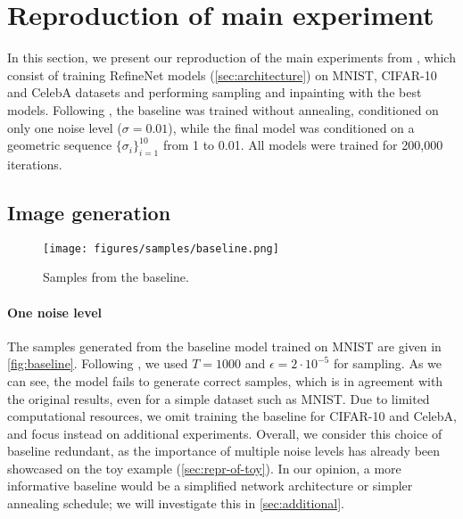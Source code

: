 
\section{Reproduction of main experiment}
\label{sec:main-exp}

In this section, we present our reproduction of the main experiments from \citep{ncsn-paper}, which consist of training RefineNet models (\autoref{sec:architecture}) on MNIST, CIFAR-10 and CelebA datasets and performing sampling and inpainting with the best models. Following \cite{ncsn-paper}, the baseline was trained without annealing, conditioned on only one noise level ($\sigma=0.01$), while the final model was conditioned on a geometric sequence $\{\sigma_i\}_{i = 1}^{10}$ from 1 to 0.01. All models were trained for 200,000 iterations. 

\subsection{Image generation}

\begin{figure}[h!]
    \centering
    \texttt{[image: figures/samples/baseline.png]}
    \caption{Samples from the baseline.}
    \label{fig:baseline}
\end{figure}
\paragraph{One noise level}
The samples generated from the baseline model trained on MNIST are given in \autoref{fig:baseline}. Following \cite{ncsn-paper}, we used $T=1000$ and $\epsilon=2 \cdot 10^{-5}$ for sampling. As we can see, the model fails to generate correct samples, which is in agreement with the original results, even for a simple dataset such as MNIST. Due to limited computational resources, we omit training the baseline for CIFAR-10 and CelebA, and focus instead on additional experiments. Overall, we consider this choice of baseline redundant, as the importance of multiple noise levels has already been showcased on the toy example (\autoref{sec:repr-of-toy}). In our opinion, a more informative baseline would be a simplified network architecture or simpler annealing schedule; we will investigate this in \autoref{sec:additional}.

